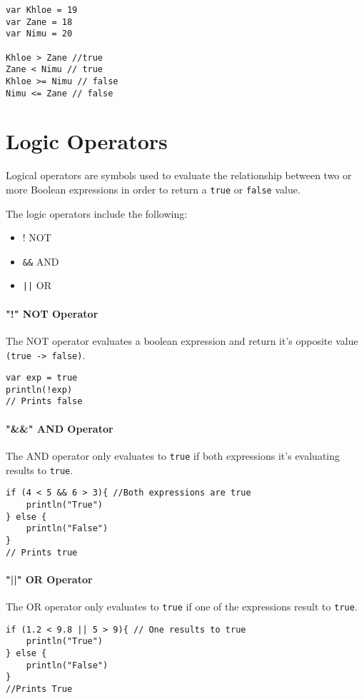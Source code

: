 \begin{verbatim}
var Khloe = 19
var Zane = 18
var Nimu = 20

Khloe > Zane //true 
Zane < Nimu // true 
Khloe >= Nimu // false 
Nimu <= Zane // false
\end{verbatim}

\section{Logic Operators}
Logical operators are symbols used to evaluate the relationship 
between two or more Boolean expressions in order to return a \verb!true! or \verb!false! value.

The logic operators include the following:
\begin{itemize}
    \item ! NOT
    \item \verb!&&! AND
    \item \verb!||! OR
\end{itemize}

\paragraph{"!" NOT Operator}
The NOT operator evaluates a boolean expression and return it's opposite value \verb!(true -> false)!. 

\begin{verbatim}
var exp = true 
println(!exp)
// Prints false
\end{verbatim}

\paragraph{"\&\&" AND Operator}
The AND operator only evaluates to \verb!true! if both expressions it's evaluating results to \verb!true!. 
\begin{verbatim}
if (4 < 5 && 6 > 3){ //Both expressions are true 
    println("True")
} else {
    println("False")
}
// Prints true 
\end{verbatim}

\paragraph{"||" OR Operator}
The OR operator only evaluates to \verb!true! if one of the expressions result to \verb!true!.
\begin{verbatim}
if (1.2 < 9.8 || 5 > 9){ // One results to true 
    println("True")
} else {
    println("False")
}
//Prints True
\end{verbatim} 

